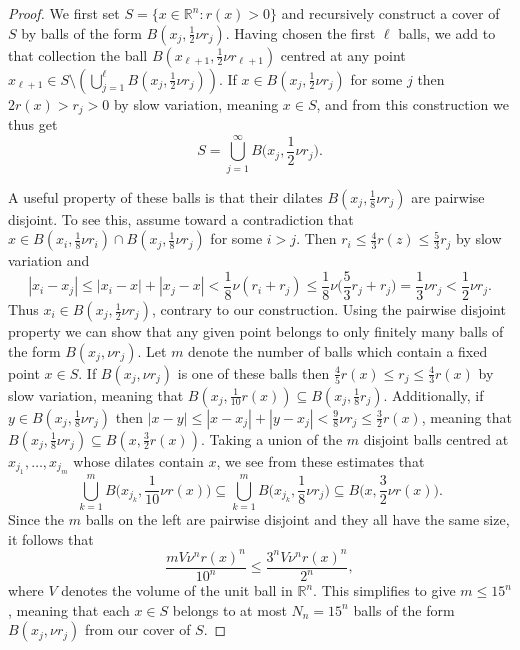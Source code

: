 \documentclass[oneside,hidelinks,indentfirst,10pt]{book}
\begin{document}
\begin{proof}
We first set \(S=\{x\in\mathbb{R}^n:r(x)>0\}\) and recursively construct a cover of \(S\) by balls of the form \(B(x_j,\frac{1}{2}\nu r_j)\). Having chosen the first \(\ell\) balls, we add to that collection the ball \(B(x_{\ell+1},\frac{1}{2}\nu r_{\ell+1})\) centred at any point \(x_{\ell+1}\in S\setminus(\bigcup_{j=1}^\ell B(x_j,\frac{1}{2}\nu r_j))\). If \(x\in B(x_j,\frac{1}{2}\nu r_j)\) for some \(j\) then \(2r(x)>r_j>0\) by slow variation, meaning \(x\in S\), and from this construction we thus get
\begin{equation}\label{eq:seteq}
    S=\bigcup_{j=1}^\infty B\bigg(x_j,\frac{1}{2}\nu r_j\bigg).
\end{equation}


A useful property of these balls is that their dilates \(B(x_j,\frac{1}{8}\nu r_j)\) are pairwise disjoint. To see this, assume toward a contradiction that \(x\in B(x_i,\frac{1}{8}\nu r_i)\cap B(x_j,\frac{1}{8}\nu r_j)\) for some \(i>j\). Then \(r_i\leq \frac{4}{3}r(z)\leq \frac{5}{3}r_j\) by slow variation and
\[
    |x_i-x_j|\leq |x_i-x|+|x_j-x|<\frac{1}{8}\nu(r_i+r_j)\leq \frac{1}{8}\nu\bigg(\frac{5}{3}r_j+r_j\bigg)=\frac{1}{3}\nu r_j<\frac{1}{2}\nu r_j.
\]
Thus \(x_i\in B(x_j,\frac{1}{2}\nu r_j)\), contrary to our construction. Using the pairwise disjoint property we can show that any given point belongs to only finitely many balls of the form \(B(x_j,\nu r_j)\). Let \(m\) denote the number of balls which contain a fixed point \(x\in S\). If \(B(x_j,\nu r_j)\) is one of these balls then \(\frac{4}{5}r(x)\leq r_j \leq \frac{4}{3}r(x)\) by slow variation, meaning that \(B(x_j,\frac{1}{10}r(x))\subseteq B(x_j,\frac{1}{8}r_j)\). Additionally, if \(y\in B(x_j,\frac{1}{8}\nu r_j)\) then \(|x-y|\leq |x-x_j|+|y-x_j|< \frac{9}{8}\nu r_j\leq \frac{3}{2}r(x)\), meaning that \(B(x_j,\frac{1}{8}\nu r_j)\subseteq B(x,\frac{3}{2}r(x))\). Taking a union of the \(m\) disjoint balls centred at \(x_{j_1},\dots,x_{j_m}\) whose dilates contain \(x\), we see from these estimates that
\[
    \bigcup_{k=1}^m B\bigg(x_{j_k},\frac{1}{10}\nu r(x)\bigg)\subseteq \bigcup_{k=1}^m B\bigg(x_{j_k},\frac{1}{8}\nu r_j\bigg)\subseteq B\bigg(x,\frac{3}{2}\nu r(x)\bigg).
\]
Since the \(m\) balls on the left are pairwise disjoint and they all have the same size, it follows that
\[
     \frac{mV \nu^nr(x)^n}{10^n}\leq \frac{3^nV \nu^nr(x)^n}{2^n},
\]
where \(V\) denotes the volume of the unit ball in \(\mathbb{R}^n\). This simplifies to give \(m \leq 15^n\), meaning that each \(x\in S\) belongs to at most \(N_n=15^n\) balls of the form \(B(x_j,\nu r_j)\) from our cover of \(S\).



\end{proof}
\end{document}
